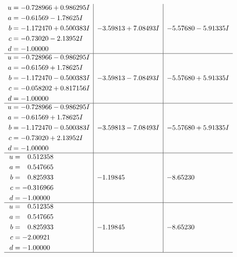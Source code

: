 \documentclass[1p]{elsarticle_modified}
\theoremstyle{definition}
\begin{document}
$$\begin{array}{c|c|c}
\begin{aligned}
u &= -0.728966 + 0.986295 I \\
a &= -0.61569 - 1.78625 I \\
b &= -1.172470 + 0.500383 I \\
c &= -0.73020 - 2.13952 I \\
d &= -1.00000\phantom{ +0.000000I}\end{aligned}
 & -3.59813 + 7.08493 I & -5.57680 - 5.91335 I \\ \hline\begin{aligned}
u &= -0.728966 - 0.986295 I \\
a &= -0.61569 + 1.78625 I \\
b &= -1.172470 - 0.500383 I \\
c &= -0.058202 + 0.817156 I \\
d &= -1.00000\phantom{ +0.000000I}\end{aligned}
 & -3.59813 - 7.08493 I & -5.57680 + 5.91335 I \\ \hline\begin{aligned}
u &= -0.728966 - 0.986295 I \\
a &= -0.61569 + 1.78625 I \\
b &= -1.172470 - 0.500383 I \\
c &= -0.73020 + 2.13952 I \\
d &= -1.00000\phantom{ +0.000000I}\end{aligned}
 & -3.59813 - 7.08493 I & -5.57680 + 5.91335 I \\ \hline\begin{aligned}
u &= \phantom{-}0.512358\phantom{ +0.000000I} \\
a &= \phantom{-}0.547665\phantom{ +0.000000I} \\
b &= \phantom{-}0.825933\phantom{ +0.000000I} \\
c &= -0.316966\phantom{ +0.000000I} \\
d &= -1.00000\phantom{ +0.000000I}\end{aligned}
 & -1.19845\phantom{ +0.000000I} & -8.65230\phantom{ +0.000000I} \\ \hline\begin{aligned}
u &= \phantom{-}0.512358\phantom{ +0.000000I} \\
a &= \phantom{-}0.547665\phantom{ +0.000000I} \\
b &= \phantom{-}0.825933\phantom{ +0.000000I} \\
c &= -2.00921\phantom{ +0.000000I} \\
d &= -1.00000\phantom{ +0.000000I}\end{aligned}
 & -1.19845\phantom{ +0.000000I} & -8.65230\phantom{ +0.000000I}\\
 \hline 
 \end{array}$$\newpage\newpage\renewcommand{\arraystretch}{1}
\end{document}
